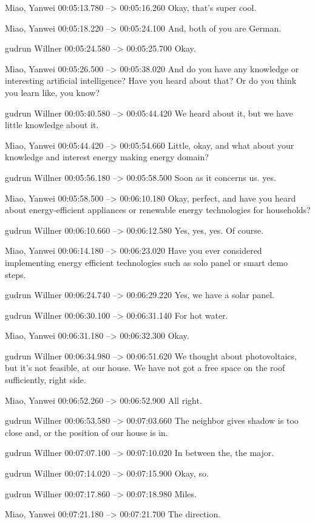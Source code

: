 {Miao, Yanwei 00:05:13.780 --> 00:05:16.260
Okay, that's super cool.

Miao, Yanwei 00:05:18.220 --> 00:05:24.100
And, both of you are German.

gudrun Willner 00:05:24.580 --> 00:05:25.700
Okay.

Miao, Yanwei 00:05:26.500 --> 00:05:38.020
And do you have any knowledge or interesting artificial intelligence? Have you heard about that? Or do you think you learn like, you know?

gudrun Willner 00:05:40.580 --> 00:05:44.420
We heard about it, but we have little knowledge about it.

Miao, Yanwei 00:05:44.420 --> 00:05:54.660
Little, okay, and what about your knowledge and interest energy making energy domain?

gudrun Willner 00:05:56.180 --> 00:05:58.500
Soon as it concerns us. yes.

Miao, Yanwei 00:05:58.500 --> 00:06:10.180
Okay, perfect, and have you heard about energy-efficient appliances or renewable energy technologies for households?

gudrun Willner 00:06:10.660 --> 00:06:12.580
Yes, yes, yes. Of course.

Miao, Yanwei 00:06:14.180 --> 00:06:23.020
Have you ever considered implementing energy efficient technologies such as solo panel or smart demo steps.

gudrun Willner 00:06:24.740 --> 00:06:29.220
Yes, we have a solar panel.

gudrun Willner 00:06:30.100 --> 00:06:31.140
For hot water.

Miao, Yanwei 00:06:31.180 --> 00:06:32.300
Okay.

gudrun Willner 00:06:34.980 --> 00:06:51.620
We thought about photovoltaics, but it's not feasible, at our house. We have not got a free space on the roof sufficiently, right side.

Miao, Yanwei 00:06:52.260 --> 00:06:52.900
All right.

gudrun Willner 00:06:53.580 --> 00:07:03.660
The neighbor gives shadow is too close and, or the position of our house is in.

gudrun Willner 00:07:07.100 --> 00:07:10.020
In between the, the major.

gudrun Willner 00:07:14.020 --> 00:07:15.900
Okay, so.

gudrun Willner 00:07:17.860 --> 00:07:18.980
Miles.

Miao, Yanwei 00:07:21.180 --> 00:07:21.700
The direction.

}

